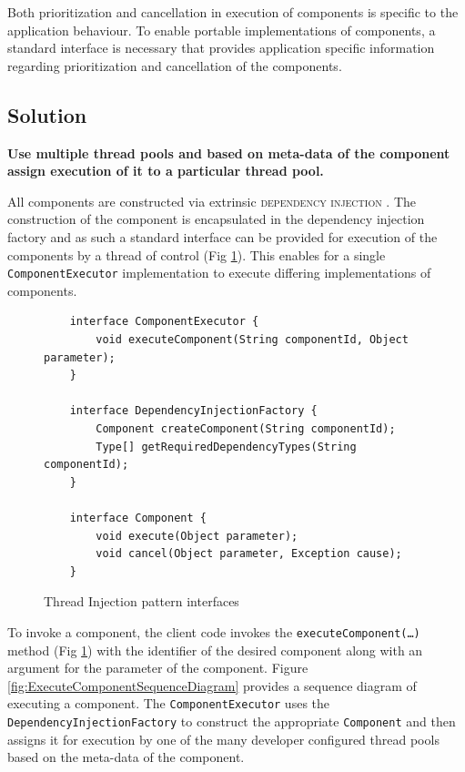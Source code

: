 \documentclass[prodmode]{style/acmlarge}
\begin{document}
Both prioritization and cancellation in execution of components is specific to
the application behaviour.  To enable portable implementations of components, a
standard interface is necessary that provides application specific information
regarding prioritization and cancellation of the components.


\subsection{Solution}

\textbf{Use multiple thread pools and based on meta-data of the component assign execution of it to a particular thread pool.}

All components are constructed via extrinsic \textsc{dependency injection}
\cite{ioc}.  The construction of the component is encapsulated in the dependency
injection factory and as such a standard interface can be provided for execution
of the components by a thread of control (Fig
\ref{fig:ThreadInjectionInterfaces}).  This enables for a single
\texttt{ComponentExecutor} implementation to execute differing implementations
of components.

\begin{figure}[tp]
\centering
\begin{verbatim}
    interface ComponentExecutor {
        void executeComponent(String componentId, Object parameter);
    }

    interface DependencyInjectionFactory {
        Component createComponent(String componentId);
        Type[] getRequiredDependencyTypes(String componentId);
    }

    interface Component {
        void execute(Object parameter); 
        void cancel(Object parameter, Exception cause);
    }
\end{verbatim}
\caption{Thread Injection pattern interfaces\footnotemark}
\label{fig:ThreadInjectionInterfaces}
\end{figure}

To invoke a component, the client code invokes the
\texttt{executeComponent(\ldots)} method (Fig
\ref{fig:ThreadInjectionInterfaces}) with the identifier of the desired
component along with an argument for the parameter of the component.
Figure \ref{fig:ExecuteComponentSequenceDiagram} provides a sequence diagram of
executing a component.  The \texttt{ComponentExecutor} uses the
\texttt{DependencyInjectionFactory} to construct the appropriate
\texttt{Component} and then assigns it for execution by one of the many
developer configured thread pools based on the meta-data of the component.
\end{document}
